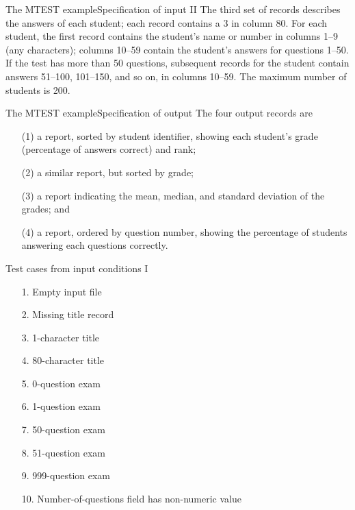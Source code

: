 \begin{Frame}{The MTEST example}{Specification of input II}
  The third set of records describes the answers of each student; each record contains a 3 in column 80. For each student, the first record contains the student's name or number in columns 1--9 (any characters); columns 10--59 contain the student's answers for questions 1--50. If the test has more than 50 questions, subsequent records for the student contain answers 51--100, 101--150, and so on, in columns 10--59. The maximum number of students is 200. 
\end{Frame}

\begin{Frame}{The MTEST example}{Specification of output}
  The four output records are 
  \begin{itemize}
    \item[(1)] a report, sorted by student identifier, showing each student's grade (percentage of answers correct) and rank; 
    \item[(2)] a similar report, but sorted by grade;  
    \item[(3)] a report indicating the mean, median, and standard deviation of the grades; and 
    \item[(4)] a report, ordered by question number, showing the percentage of students answering each questions correctly.
  \end{itemize}
\end{Frame}

\begin{Frame}{Test cases from input conditions I}
  \begin{itemize}
    \item[1.] Empty input file
    \item[2.] Missing title record
    \item[3.] 1-character title
    \item[4.] 80-character title
    \item[5.] 0-question exam
    \item[6.] 1-question exam
    \item[7.] 50-question exam
    \item[8.] 51-question exam
    \item[9.] 999-question exam
    \item[10.] Number-of-questions field has non-numeric value
  \end{itemize}
\end{Frame}

